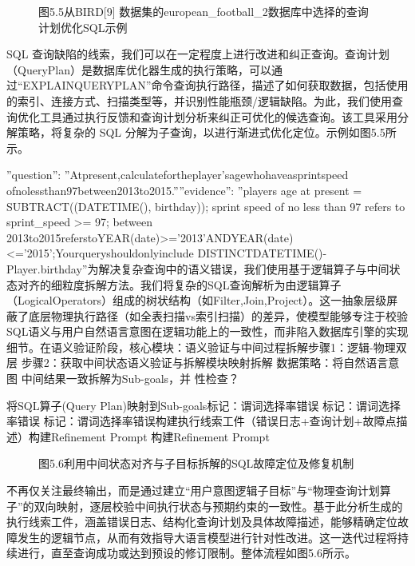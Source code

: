 \documentclass[12pt,a4paper,openright,UTF8]{ctexbook}
\begin{document}
\begin{figure}[htbp]
\centering
{}
\caption{图5.5从BIRD[9] 数据集的european_football_2数据库中选择的查询计划优化SQL示例}
\end{figure}

SQL 查询缺陷的线索，我们可以在一定程度上进行改进和纠正查询。查询计划（QueryPlan）是数据库优化器生成的执行策略，可以通过“EXPLAINQUERYPLAN”命令查询执行路径，描述了如何获取数据，包括使用的索引、连接方式、扫描类型等，并识别性能瓶颈/逻辑缺陷。为此，我们使用查询优化工具通过执行反馈和查询计划分析来纠正可优化的候选查询。该工具采用分解策略，将复杂的 SQL 分解为子查询，以进行渐进式优化定位。示例如图5.5所示。


”question”: ”Atpresent,calculatefortheplayer’sagewhohaveasprintspeed ofnolessthan97between2013to2015.””evidence”: ”players age at present = SUBTRACT((DATETIME(), birthday)); sprint speed of no less than 97 refers to sprint\_speed >= 97; between 2013to2015referstoYEAR(date)>=’2013’ANDYEAR(date)<=’2015’;Yourqueryshouldonlyinclude DISTINCTDATETIME()-Player.birthday”为解决复杂查询中的语义错误，我们使用基于逻辑算子与中间状态对齐的细粒度拆解方法。我们将复杂的SQL查询解析为由逻辑算子（LogicalOperators）组成的树状结构（如Filter,Join,Project）。这一抽象层级屏蔽了底层物理执行路径（如全表扫描vs索引扫描）的差异，使模型能够专注于校验SQL语义与用户自然语言意图在逻辑功能上的一致性，而非陷入数据库引擎的实现细节。在语义验证阶段，核心模块：语义验证与中间过程拆解步骤1：逻辑-物理双层 步骤2：获取中间状态语义验证与拆解模块映射拆解 数据策略：将自然语言意图 中间结果一致拆解为Sub-goals，并 性检查？


将SQL算子(Query Plan)映射到Sub-goals标记：谓词选择率错误 标记：谓词选择率错误 标记：谓词选择率错误构建执行线索工件（错误日志+查询计划+故障点描述）构建Refinement Prompt 构建Refinement Prompt

\begin{figure}[htbp]
\centering
{}
\caption{图5.6利用中间状态对齐与子目标拆解的SQL故障定位及修复机制}
\end{figure}

不再仅关注最终输出，而是通过建立“用户意图逻辑子目标”与“物理查询计划算子”的双向映射，逐层校验中间执行状态与预期约束的一致性。基于此分析生成的执行线索工件，涵盖错误日志、结构化查询计划及具体故障描述，能够精确定位故障发生的逻辑节点，从而有效指导大语言模型进行针对性改进。这一迭代过程将持续进行，直至查询成功或达到预设的修订限制。整体流程如图5.6所示。
\end{document}

